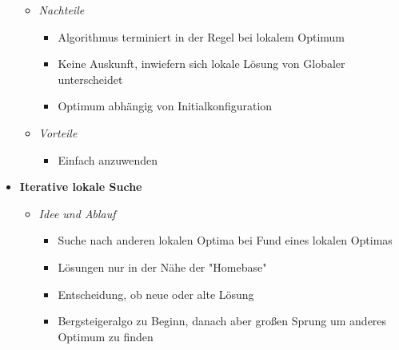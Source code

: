 \begin{itemize}
\begin{itemize}
\pagebreak
                \item \textit{Nachteile}
                    \begin{itemize}
                        \item Algorithmus terminiert in der Regel bei lokalem Optimum
                        \item Keine Auskunft, inwiefern sich lokale Lösung von Globaler unterscheidet
                        \item Optimum abhängig von Initialkonfiguration
                    \end{itemize}
                \item \textit{Vorteile}
                    \begin{itemize}
                        \item Einfach anzuwenden
                    \end{itemize}
            \end{itemize}

        \item \textbf{Iterative lokale Suche}
            \begin{itemize}
                \item \textit{Idee und Ablauf}
                    \begin{itemize}
                        \item Suche nach anderen lokalen Optima bei Fund eines lokalen Optimas
                        \item Lösungen nur in der Nähe der \string"Homebase\string"
                        \item Entscheidung, ob neue oder alte Lösung
                        \item Bergsteigeralgo zu Beginn, danach aber großen Sprung um anderes Optimum zu finden
                    \end{itemize}


\end{itemize}
\end{itemize}
